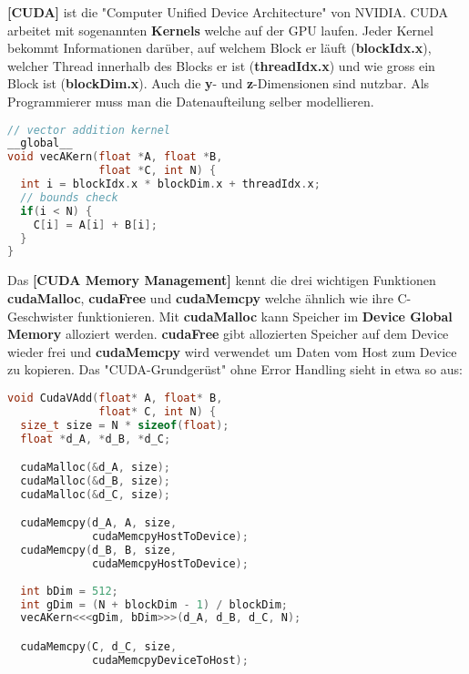 \documentclass[8pt]{extarticle}
\let\oldtextbf\textbf
\renewcommand{\textbf}{\tiny\oldtextbf}
\begin{document}
\begin{multicols*}{5}
\textbf{[CUDA]} ist die "Computer Unified Device Architecture" von NVIDIA. CUDA arbeitet mit sogenannten \textbf{Kernels} welche auf der GPU laufen. Jeder Kernel bekommt Informationen darüber, auf welchem Block er läuft (\textbf{blockIdx.x}), welcher Thread innerhalb des Blocks er ist (\textbf{threadIdx.x}) und wie gross ein Block ist (\textbf{blockDim.x}). Auch die \textbf{y}- und \textbf{z}-Dimensionen sind nutzbar. Als Programmierer muss man die Datenaufteilung selber modellieren.
\begin{lstlisting}[language=c]
// vector addition kernel
__global__
void vecAKern(float *A, float *B,
              float *C, int N) {
  int i = blockIdx.x * blockDim.x + threadIdx.x;
  // bounds check
  if(i < N) {
    C[i] = A[i] + B[i];
  }
}
\end{lstlisting}
Das \textbf{[CUDA Memory Management]} kennt die drei wichtigen Funktionen \textbf{cudaMalloc}, \textbf{cudaFree} und \textbf{cudaMemcpy} welche ähnlich wie ihre C-Geschwister funktionieren. Mit \textbf{cudaMalloc} kann Speicher im \textbf{Device Global Memory} alloziert werden. \textbf{cudaFree} gibt allozierten Speicher auf dem Device wieder frei und \textbf{cudaMemcpy} wird verwendet um Daten vom Host zum Device zu kopieren. Das "CUDA-Grundgerüst" ohne Error Handling sieht in etwa so aus:
\begin{lstlisting}[language=c]
void CudaVAdd(float* A, float* B,
              float* C, int N) {
  size_t size = N * sizeof(float);
  float *d_A, *d_B, *d_C;

  cudaMalloc(&d_A, size);
  cudaMalloc(&d_B, size);
  cudaMalloc(&d_C, size);

  cudaMemcpy(d_A, A, size,
             cudaMemcpyHostToDevice);
  cudaMemcpy(d_B, B, size,
             cudaMemcpyHostToDevice);
  
  int bDim = 512;
  int gDim = (N + blockDim - 1) / blockDim;
  vecAKern<<<gDim, bDim>>>(d_A, d_B, d_C, N);

  cudaMemcpy(C, d_C, size,
             cudaMemcpyDeviceToHost);


\end{lstlisting}
\end{multicols*}
\end{document}
